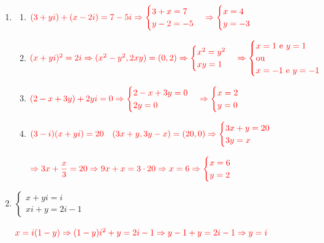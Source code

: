 \documentclass[12pt, openright, a4paper, twoside, english, brazil]{article}
\newenvironment{qitem}{
  \color{black}
\item}{\vspace{10pt}}
\newenvironment{qmitem}{
  \color{black}
\item
\begin{enumerate}[\bfseries a)]}{
\end{enumerate}\vspace{10pt}}
\begin{document}
\begin{enumerate}[\bfseries 1.]
\begin{qmitem}
  \item $\color{red} (3+yi) + (x-2i) = 7-5i \Rightarrow
    \begin{cases} 3+x=7 \\ y-2=-5
    \end{cases} \Rightarrow
    \begin{cases} x=4 \\ y=-3
    \end{cases}$

  \item $\color{red} (x+yi)^2 = 2i \Rightarrow (x^2-y^2, 2xy) = (0,2)
    \Rightarrow
    \begin{cases} x^2=y^2 \\ xy=1
    \end{cases} \Rightarrow
    \begin{cases} x=1 \text{ e } y=1 \\ \text{ou} \\ x=-1 \text{ e } y=-1
    \end{cases}$

  \item $\color{red} (2-x+3y) + 2yi = 0 \Rightarrow
    \begin{cases} 2-x+3y=0 \\ 2y=0
    \end{cases} \Rightarrow
    \begin{cases} x=2 \\ y=0
    \end{cases}$

  \item $\color{red} (3-i)(x+yi) = 20 \quad (3x+y, 3y-x) = (20,0) \Rightarrow
    \begin{cases} 3x+y=20 \\ 3y=x
    \end{cases}$

    $\color{red}\displaystyle\Rightarrow 3x + \frac{x}{3} = 20
    \Rightarrow 9x+x = 3
    \cdot 20 \Rightarrow x=6 \Rightarrow
    \begin{cases} x=6 \\ y=2
    \end{cases}$
  \end{qmitem}

  \begin{qitem} %
    $
    \begin{cases} x+yi=i \\ xi+y=2i-1
    \end{cases}$

    $\color{red}x=i(1-y) \Rightarrow (1-y)i^2+y=2i-1 \Rightarrow
    y-1+y=2i-1 \Rightarrow y=i$


\end{qitem}
\end{enumerate}
\end{document}
